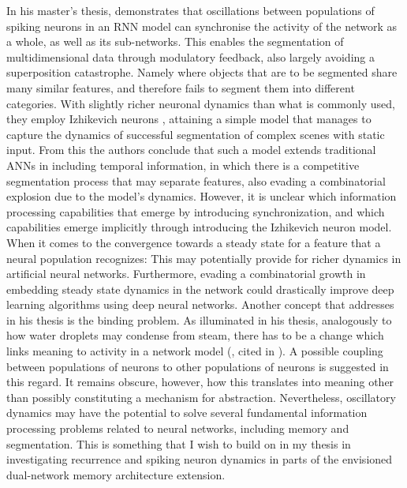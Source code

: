In his master's thesis, \cite{Solbakken2009} demonstrates that oscillations between populations of spiking neurons in an RNN model can synchronise the activity of the network as a whole, as well as its sub-networks. This enables the segmentation of multidimensional data through modulatory feedback, also largely avoiding a superposition catastrophe. Namely where objects that are to be segmented share many similar features, and therefore fails to segment them into different categories. With slightly richer neuronal dynamics than what is commonly used, they employ Izhikevich neurons \citep{Izhikevich2003}, attaining a simple model that manages to capture the dynamics of successful segmentation of complex scenes with static input. From this the authors conclude that such a model extends traditional ANNs in including temporal information, in which there is a competitive segmentation process that may separate features, also evading a combinatorial explosion due to the model's dynamics. However, it is unclear which information processing capabilities that emerge by introducing synchronization, and which capabilities emerge implicitly through introducing the Izhikevich neuron model. When it comes to the convergence towards a steady state for a feature that a neural population recognizes: This may potentially provide for richer dynamics in artificial neural networks. Furthermore, evading a combinatorial growth in embedding steady state dynamics in the network could drastically improve deep learning algorithms using deep neural networks. Another concept that \cite{Solbakken2009} addresses in his thesis is the binding problem. As illuminated in his thesis, analogously to how water droplets may condense from steam,  there has to be a change which links meaning to activity in a network model (\cite{Freeman2003}, cited in \cite{Solbakken2009}). A possible coupling between populations of neurons to other populations of neurons is suggested in this regard. It remains obscure, however, how this translates into meaning other than possibly constituting a mechanism for abstraction. Nevertheless, oscillatory dynamics may have the potential to solve several fundamental information processing problems related to neural networks, including memory and segmentation. This is something that I wish to build on in my thesis in investigating recurrence and spiking neuron dynamics in parts of the envisioned dual-network memory architecture extension.

